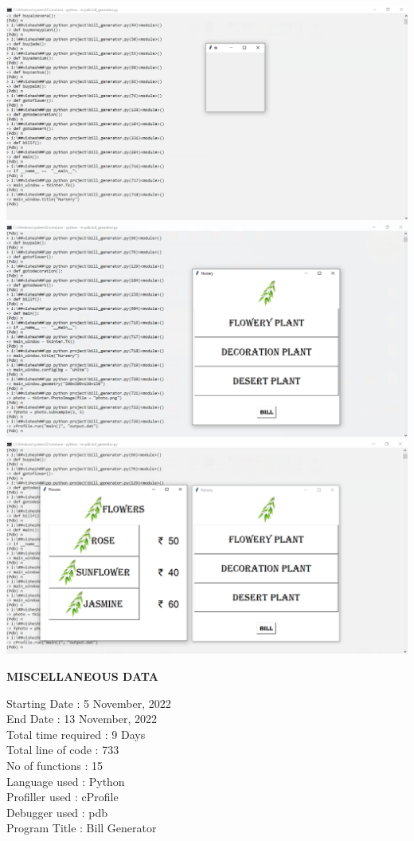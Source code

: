 \documentclass[11pt,a4paper]{article}
\begin{document}
\begin{center}
\includegraphics[scale = .6]{debug5.png}\\
\includegraphics[scale = .6]{debug6.png}\\
\includegraphics[scale = .6]{debug7.png}\\

\end{center}


\pagebreak

\begin{center}
	\textbf{MISCELLANEOUS DATA}
\end{center}

\begin{flushleft}
Starting Date : 5 November, 2022 \\
End Date : 13 November, 2022\\
Total time required : 9 Days\\
Total line of code : 733\\
No of functions : 15\\
Language used : Python\\
Profiller used : cProfile\\
Debugger used : pdb\\
Program Title : Bill Generator\\

\end{flushleft}
\end{document}
